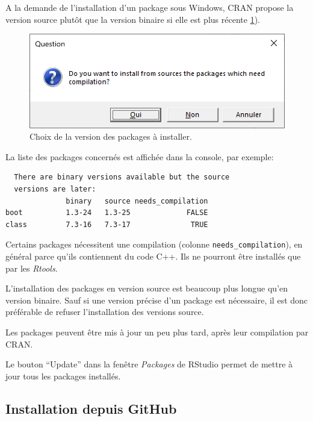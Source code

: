 \documentclass[
  12pt,
  french,
  a4paper,
  extrafontsizes,onecolumn,openright
  ]{memoir}
\begin{document}
A la demande de l'installation d'un package sous Windows, CRAN propose la version source plutôt que la version binaire si elle est plus récente \ref{fig:R-BinaryPkg}).



\scriptsize

\begin{figure}

{\centering \includegraphics[width=0.8\linewidth]{images/R-BinaryPkg} 

}

\caption{Choix de la version des packages à installer.}\label{fig:R-BinaryPkg}
\end{figure}

\normalsize

La liste des packages concernés est affichée dans la console, par exemple:

\begin{verbatim}
  There are binary versions available but the source 
  versions are later:
              binary   source needs_compilation
boot          1.3-24   1.3-25             FALSE
class         7.3-16   7.3-17              TRUE
\end{verbatim}

Certains packages nécessitent une compilation (colonne \texttt{needs\_compilation}), en général parce qu'ils contiennent du code C++.
Ils ne pourront être installés que par les \emph{Rtools}.

L'installation des packages en version source est beaucoup plus longue qu'en version binaire.
Sauf si une version précise d'un package est nécessaire, il est donc préférable de refuser l'installation des versions source.

Les packages peuvent être mis à jour un peu plus tard, après leur compilation par CRAN.

Le bouton \enquote{Update} dans la fenêtre \emph{Packages} de RStudio permet de mettre à jour tous les packages installés.

\subsection{Installation depuis GitHub}\label{installation-depuis-github}
\end{document}
